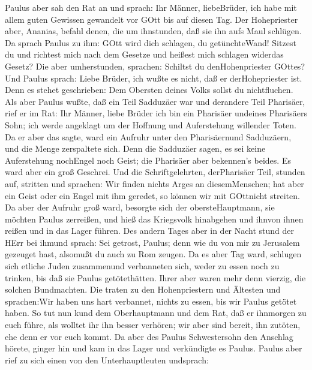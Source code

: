 Paulus aber sah den Rat an und sprach: Ihr Männer,
liebeBrüder, ich habe mit allem guten Gewissen gewandelt vor GOtt bis
auf diesen Tag.  Der Hohepriester aber, Ananias, befahl
denen, die um ihnstunden, daß sie ihn aufs Maul schlügen. 
Da sprach Paulus zu ihm: GOtt wird dich schlagen, du getünchteWand!
Sitzest du und richtest mich nach dem Gesetze und heißest mich schlagen
widerdas Gesetz?  Die aber umherstunden, sprachen: Schiltst
du denHohenpriester GOttes?  Und Paulus sprach: Liebe
Brüder, ich wußte es nicht, daß er derHohepriester ist. Denn es stehet
geschrieben: Dem Obersten deines Volks sollst du nichtfluchen.
 Als aber Paulus wußte, daß ein Teil Sadduzäer war und
derandere Teil Pharisäer, rief er im Rat: Ihr Männer, liebe Brüder ich
bin ein Pharisäer undeines Pharisäers Sohn; ich werde angeklagt um der
Hoffnung und Auferstehung willender Toten.  Da er aber das
sagte, ward ein Aufruhr unter den Pharisäernund Sadduzäern, und die
Menge zerspaltete sich.  Denn die Sadduzäer sagen, es sei
keine Auferstehung nochEngel noch Geist; die Pharisäer aber bekennen's
beides.  Es ward aber ein groß Geschrei. Und die
Schriftgelehrten, derPharisäer Teil, stunden auf, stritten und sprachen:
Wir finden nichts Arges an diesemMenschen; hat aber ein Geist oder ein
Engel mit ihm geredet, so können wir mit GOttnicht streiten.
 Da aber der Aufruhr groß ward, besorgte sich der
obersteHauptmann, sie möchten Paulus zerreißen, und hieß das Kriegsvolk
hinabgehen und ihnvon ihnen reißen und in das Lager führen.
 Des andern Tages aber in der Nacht stund der HErr bei
ihmund sprach: Sei getrost, Paulus; denn wie du von mir zu Jerusalem
gezeuget hast, alsomußt du auch zu Rom zeugen.  Da es aber
Tag ward, schlugen sich etliche Juden zusammenund verbanneten sich,
weder zu essen noch zu trinken, bis daß sie Paulus getötethätten.
 Ihrer aber waren mehr denn vierzig, die solchen
Bundmachten.  Die traten zu den Hohenpriestern und Ältesten
und sprachen:Wir haben uns hart verbannet, nichts zu essen, bis wir
Paulus getötet haben.  So tut nun kund dem Oberhauptmann
und dem Rat, daß er ihnmorgen zu euch führe, als wolltet ihr ihn besser
verhören; wir aber sind bereit, ihn zutöten, ehe denn er vor euch kommt.
 Da aber des Paulus Schwestersohn den Anschlag hörete,
ginger hin und kam in das Lager und verkündigte es Paulus. 
Paulus aber rief zu sich einen von den Unterhauptleuten undsprach:
